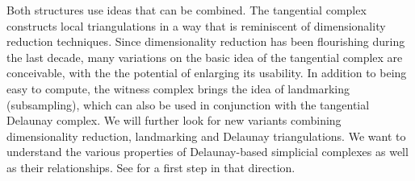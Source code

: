  Both structures use ideas that can be combined. The tangential complex constructs local triangulations in a way that is reminiscent of dimensionality reduction techniques. Since dimensionality reduction has been flourishing during the last decade, many variations on the basic idea of the tangential complex are conceivable, with the the potential of enlarging its usability. In addition to being easy to compute, the witness complex brings the idea of landmarking (subsampling), which can also be used in conjunction with the tangential Delaunay complex. We will further look for new
variants combining dimensionality reduction, landmarking and Delaunay triangulations. 
%
We want to understand the various properties of Delaunay-based simplicial complexes as well as their relationships. See \cite{boissonnat2012stab} for a  first step in that direction.





